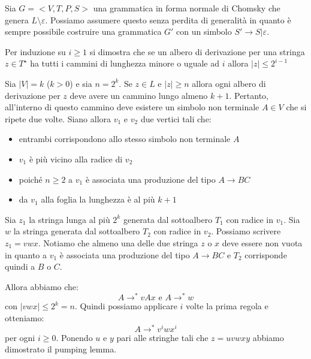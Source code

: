 \documentclass[a4paper, 10pt]{report}
\begin{document}
\begin{tcolorbox}[title=\textbf{dimostrazione}]
Sia $G = <V, T, P, S>$ una grammatica in forma normale di Chomsky che genera $L\setminus\varepsilon$. Possiamo assumere questo senza perdita di generalità in quanto è sempre possibile costruire una grammatica $G'$ con un simbolo $S'\rightarrow S|\varepsilon$.
	
	Per induzione su $i\geq 1$ si dimostra che se un albero di derivazione per una stringa $z\in T^\star$ ha tutti i cammini di lunghezza minore o uguale ad $i$ allora $|z|\leq 2^{i-1}$
	
	Sia $|V|=k$ ($k>0$) e sia $n=2^k$. Se $z\in L$ e $|z|\geq n$ allora ogni albero di derivazione per $z$ deve avere un cammino lungo almeno $k+1$. Pertanto, all'interno di questo cammino deve esistere un simbolo non terminale $A\in V$ che si ripete due volte. Siano allora $v_1$ e $v_2$ due vertici tali che:
	\begin{itemize}
		\item entrambi corrispondono allo stesso simbolo non terminale $A$
		\item $v_1$ è più vicino alla radice di $v_2$
		\item poiché $n\geq 2$ a $v_1$ è associata una produzione del tipo $A\rightarrow BC$
		\item da $v_1$ alla foglia la lunghezza è al più $k+1$
	\end{itemize}
	
	Sia $z_1$ la stringa lunga al più $2^k$ generata dal sottoalbero $T_1$ con radice in $v_1$. Sia $w$ la stringa generata dal sottoalbero $T_2$ con radice in $v_2$. Possiamo scrivere $z_1=vwx$. Notiamo che almeno una delle due stringa $z$ o $x$ deve essere non vuota in quanto a $v_1$ è associata una produzione del tipo $A\rightarrow BC$ e $T_2$ corrisponde quindi a $B$ o $C$. 
\end{tcolorbox}

\begin{tcolorbox}
Allora abbiamo che:
	\[
		A\rightarrow^* vAx\text{ e }A\rightarrow^* w
	\]
	con $|vwx|\leq 2^k = n$. Quindi possiamo applicare $i$ volte la prima regola e otteniamo:
	\[
		A\rightarrow^* v^iwx^i
	\]
	per ogni $i\geq 0$. Ponendo $u$ e $y$ pari alle stringhe tali che $z=uvwxy$ abbiamo dimostrato il pumping lemma. 
\end{tcolorbox}
\end{document}
